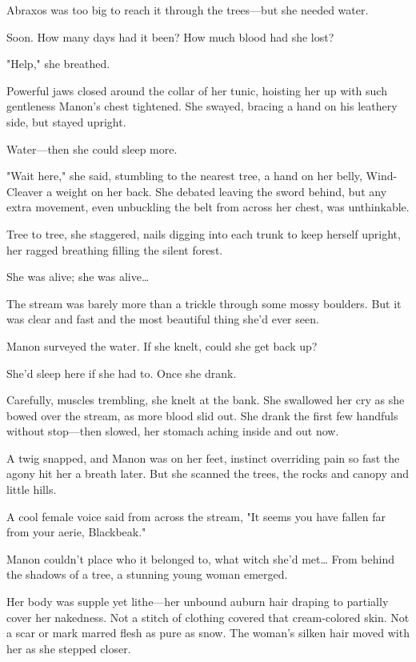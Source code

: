 Abraxos was too big to reach it through the trees---but she needed water.

Soon. How many days had it been? How much blood had she lost?

"Help," she breathed.

Powerful jaws closed around the collar of her tunic, hoisting her up with such gentleness Manon's chest tightened. She swayed, bracing a hand on his leathery side, but stayed upright.

Water---then she could sleep more.

"Wait here," she said, stumbling to the nearest tree, a hand on her belly, Wind-Cleaver a weight on her back. She debated leaving the sword behind, but any extra movement, even unbuckling the belt from across her chest, was unthinkable.

Tree to tree, she staggered, nails digging into each trunk to keep herself upright, her ragged breathing filling the silent forest.

She was alive; she was alive\ldots{}

The stream was barely more than a trickle through some mossy boulders. But it was clear and fast and the most beautiful thing she'd ever seen.

Manon surveyed the water. If she knelt, could she get back up?

She'd sleep here if she had to. Once she drank.

Carefully, muscles trembling, she knelt at the bank. She swallowed her cry as she bowed over the stream, as more blood slid out. She drank the first few handfuls without stop---then slowed, her stomach aching inside and out now.

A twig snapped, and Manon was on her feet, instinct overriding pain so fast the agony hit her a breath later. But she scanned the trees, the rocks and canopy and little hills.

A cool female voice said from across the stream, "It seems you have fallen far from your aerie, Blackbeak."

Manon couldn't place who it belonged to, what witch she'd met\ldots{}
From behind the shadows of a tree, a stunning young woman emerged.

Her body was supple yet lithe---her unbound auburn hair draping to partially cover her nakedness. Not a stitch of clothing covered that cream-colored skin. Not a scar or mark marred flesh as pure as snow. The woman's silken hair moved with her as she stepped closer.

